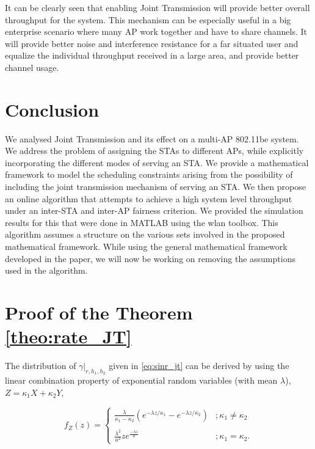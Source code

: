 It can be clearly seen that enabling Joint Transmission will provide better overall throughput for the system. This mechanism can be especially useful in a big enterprise scenario where many AP work together and have to share channels. It will provide better noise and interference resistance for a far situated user and equalize the individual throughput received in a large area, and provide better channel usage.





\section{Conclusion}
\label{sec:conclusion}

We analysed Joint Transmission and its effect on a multi-AP 802.11be system. We address the problem of assigning the STAs to different APs, while explicitly incorporating the different modes of serving an STA. We provide a mathematical framework to model the scheduling constraints arising from the possibility of including the joint transmission mechanism of serving an STA. We then propose an online algorithm that attempts to achieve a high system level throughput under an inter-STA and inter-AP fairness criterion. We provided the simulation results for this that were done in MATLAB using the wlan toolbox. This algorithm assumes a structure on the various sets involved in the proposed mathematical framework. While using the general mathematical framework developed in the paper, we will now be working on removing the assumptions used in the algorithm.


\appendix
\appendixpage
\section{Proof of the Theorem \ref{theo:rate_JT}}
\label{proof:theo:rate_JT}
The distribution of $\gamma|_{r, h_1,h_2}$ given in \eqref{eq:sinr_jt} can be derived by using the linear combination property of exponential random variables (with mean $\lambda$), $Z=\kappa_1 X+\kappa_2 Y$,  

\begin{equation}
f_Z(z)  = \begin{cases}
\displaystyle\frac{\lambda}{\kappa_1-\kappa_2}\left(e^{-\lambda z /\kappa_1}-e^{-\lambda z /\kappa_2}\right) &; \kappa_1\neq \kappa_2\\\\
\displaystyle\frac{\lambda^2}{a^2} z e^{\frac{-\lambda z}{a}} &; \kappa_1= \kappa_2.
\end{cases}
\label{eq:combined_distribution}
\end{equation}


